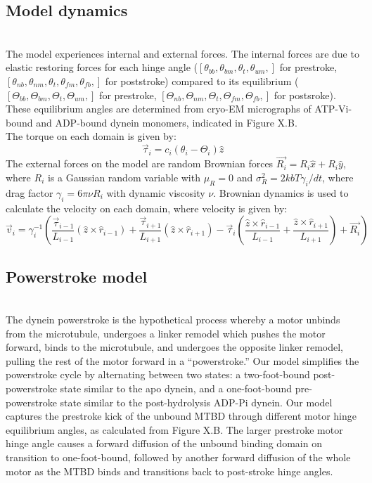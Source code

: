 \documentclass[9pt,twocolumn,twoside]{pnas-new}
\begin{document}
\subsection*{Model dynamics}~\\
The model experiences internal and external forces. The internal forces are due to elastic restoring forces for each hinge angle ($\left[\theta_{bb}, \theta_{bm}, \theta_{t}, \theta_{um},\right]$ for prestroke, $\left[\theta_{nb}, \theta_{nm}, \theta_{t}, \theta_{fm}, \theta_{fb},\right]$ for poststroke) compared to its equilibrium ($\left[\Theta_{bb}, \Theta_{bm}, \Theta_{t}, \Theta_{um},\right]$ for prestroke, $\left[\Theta_{nb}, \Theta_{nm}, \Theta_{t}, \Theta_{fm}, \Theta_{fb},\right]$ for postsroke). These equilibrium angles are determined from cryo-EM micrographs of ATP-Vi-bound and ADP-bound dynein monomers, indicated in Figure X.B.\\

The torque on each domain is given by:
%
\begin{equation}
  \vec{\tau}_{i} = c_i\left(\theta_{i}-\Theta_{i}\right)\hat{z}
\end{equation}
%
The external forces on the model are random Brownian forces $\vec{R_i} = R_i\hat{x} + R_i\hat{y}$, where $R_i$ is a Gaussian random variable with $\mu_R = 0$ and $\sigma^2_R = 2kbT\gamma_i/dt$, where drag factor $\gamma_i = 6\pi\nu R_i$ with dynamic viscosity $\nu$. Brownian dynamics is used to calculate the velocity on each domain, where velocity is given by:
%
\begin{dmath}
  \vec{v}_i = \gamma_i^{-1}\left(\frac{\vec{\tau}_{i-1}}{L_{i-1}}\left(\hat{z}\times\hat{r}_{i-1}\right)
  + \frac{\vec{\tau}_{i+1}}{L_{i+1}}\left(\hat{z}\times\hat{r}_{i+1}\right)
  - \vec{\tau}_{i}\left(\frac{\hat{z}\times\hat{r}_{i-1}}{L_{i-1}}+\frac{\hat{z}\times\hat{r}_{i+1}}{L_{i+1}}\right) + \vec{R_i}\right)
  \label{eq:motionequation}
\end{dmath}
%
\subsection*{Powerstroke model}~\\
The dynein powerstroke is the hypothetical process whereby a motor unbinds from the microtubule, undergoes a linker remodel which pushes the motor forward, binds to the microtubule, and undergoes the opposite linker remodel, pulling the rest of the motor forward in a ``powerstroke.'' Our model simplifies the powerstroke cycle by alternating between two states: a two-foot-bound post-powerstroke state similar to the apo dynein, and a one-foot-bound pre-powerstroke state similar to the post-hydrolysis ADP-Pi dynein. Our model captures the prestroke kick of the unbound MTBD through different motor hinge equilibrium angles, as calculated from Figure X.B. The larger prestroke motor hinge angle causes a forward diffusion of the unbound binding domain on transition to one-foot-bound, followed by another forward diffusion of the whole motor as the MTBD binds and transitions back to post-stroke hinge angles.\\
\end{document}
